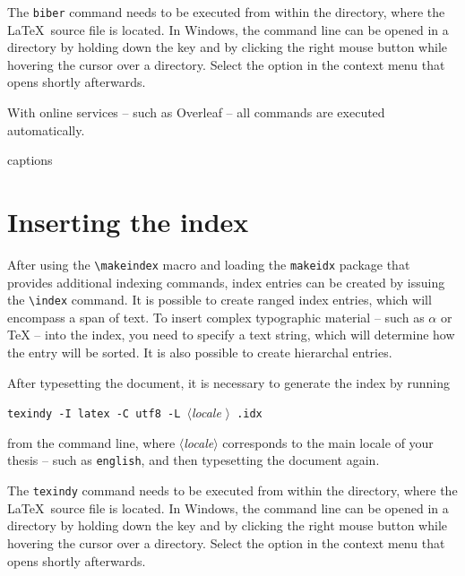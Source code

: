 \documentclass[
  digital, %
  table,   %
%
  lof,     %
  lot,     %
]{fithesis3}
\begin{document}
{The \texttt{biber} command needs to be executed from within the
directory, where the \LaTeX\ source file is located. In Windows,
the command line can be opened in a directory by holding down the
 key and by clicking the right mouse button while
hovering the cursor over a directory.  Select the  option in the context menu that opens shortly
afterwards.

With online services -- such as Overleaf -- all commands are
executed automatically.

{\csname captions\languagename\endcsname %
\makeatletter %
  \thesis@selectLocale{\thesis@locale}\makeatother
\printbibliography[heading=bibintoc]} %

\chapter{Inserting the index}
After using the \verb"\makeindex" macro and loading the
\texttt{makeidx} package that provides additional indexing
commands, index entries can be created by issuing the \verb"\index"
command. It is possible to create ranged index
entries, which will encompass a span of text.
To insert complex typographic material -- such as $\alpha$
 or \TeX{}  --
into the index, you need to specify a text string, which will
determine how the entry will be sorted. It is also possible to
create hierarchal entries. 

After typesetting the document, it is necessary to generate the
index by running
\begin{center}%
  \texttt{texindy -I latex -C utf8 -L }$\langle$\textit{locale}%
  $\rangle$\texttt{ \jobname.idx}
\end{center}
from the command line, where $\langle$\textit{locale}$\rangle$
corresponds to the main locale of your thesis -- such as
\texttt{english}, and then typesetting the document again.

The \texttt{texindy} command needs to be executed from within the
directory, where the \LaTeX\ source file is located. In Windows,
the command line can be opened in a directory by holding down the
 key and by clicking the right mouse button while
hovering the cursor over a directory. Select the  option in the context menu that opens shortly
afterwards.

}
\end{document}
